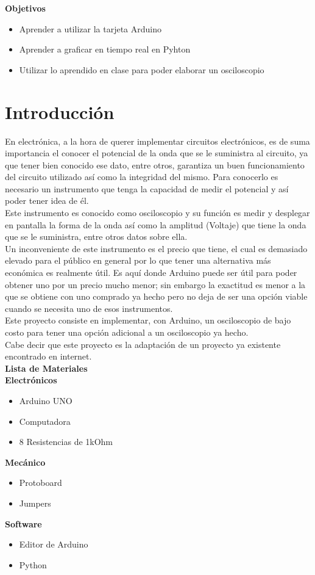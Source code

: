 \documentclass{article}
\begin{document}
\setcounter{figure}{0}
{\LARGE\textbf{Objetivos}}
\begin{itemize}
\item Aprender a utilizar la tarjeta Arduino
\item Aprender a graficar en tiempo real en Pyhton
\item Utilizar lo aprendido en clase para poder elaborar un osciloscopio
\end{itemize}
 \section{Introducción}
En electrónica, a la hora de querer implementar circuitos electrónicos, es de suma
importancia el conocer el potencial de la onda que se le suministra al circuito, ya que
tener bien conocido ese dato, entre otros, garantiza un buen funcionamiento del circuito
utilizado así como la integridad  del mismo. Para conocerlo es necesario un instrumento
que tenga la capacidad de medir el potencial y así poder tener idea de él.\\
Este instrumento es conocido como osciloscopio y su función es medir y desplegar en
pantalla la forma de la onda así como la amplitud (Voltaje) que tiene la onda que se le
suministra, entre otros datos sobre ella.\\
Un inconveniente de este instrumento es el precio que tiene, el cual es demasiado elevado
para el público en general por lo que tener una alternativa más económica es realmente
útil. Es aquí donde Arduino puede ser útil para poder obtener uno por un precio mucho
menor; sin embargo la exactitud es menor a la que se obtiene con uno comprado ya hecho
pero no deja de ser una opción viable cuando se necesita uno de esos instrumentos.\\
 Este proyecto consiste en implementar, con Arduino, un osciloscopio de bajo costo para
 tener una opción adicional a un osciloscopio ya hecho.\\
Cabe decir que este proyecto es la adaptación de un proyecto ya existente encontrado en
internet.\\

\noindent
\textbf{Lista de Materiales}\\
\textbf{Electrónicos}
\begin{itemize}
\item Arduino UNO
\item Computadora
\item 8 Resistencias de 1kOhm
\end{itemize}
\textbf{Mecánico}
\begin{itemize}
\item Protoboard
\item Jumpers
\end{itemize}
\textbf{Software}
\begin{itemize}
\item Editor de Arduino
\item Python
\end{itemize}
\end{document}
